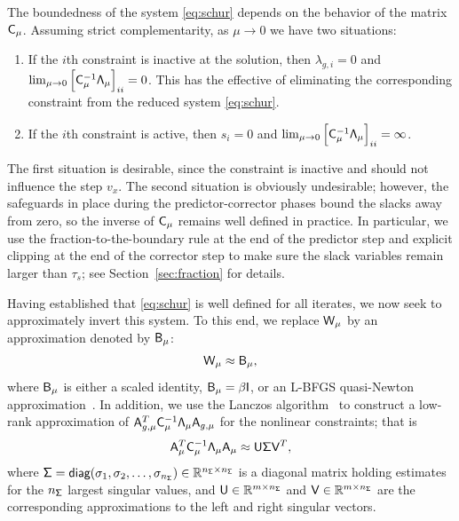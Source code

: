 The boundedness of the system \eqref{eq:schur} depends on the behavior of the
matrix $\mathsf{C}_{\mu}$.  Assuming strict complementarity, as $\mu\rightarrow 0$
we have two situations:
\begin{enumerate}
\item If the $i$th constraint is inactive at the solution, then $\lambda_{g,i} = 0$ and
  $\lim_{\mu\rightarrow 0} \left[\mathsf{C}_\mu^{-1} \mathsf{\Lambda}_\mu \right]_{ii}
  = 0$.  This has the effective of eliminating the corresponding constraint from
  the reduced system \eqref{eq:schur}.

\item If the $i$th constraint is active, then $s_i = 0$ and $\lim_{\mu\rightarrow 0}
  \left[\mathsf{C}_\mu^{-1} \mathsf{\Lambda}_\mu \right]_{ii} = \infty$.
\end{enumerate}
The first situation is desirable, since the constraint is inactive and should
not influence the step $v_x$.  The second situation is obviously undesirable;
however, the safeguards in place during the predictor-corrector phases bound the
slacks away from zero, so the inverse of $\mathsf{C}_{\mu}$ remains well defined in practice.
In particular, we use the fraction-to-the-boundary rule 
at the end of the predictor step and explicit clipping at the end of the corrector step to make sure 
the slack variables remain larger than $\tau_s$; see Section~\ref{sec:fraction} for details.



Having established that \eqref{eq:schur} is well defined for all iterates, we
now seek to approximately invert this system.  To this end, we replace
$\mathsf{W}_{\mu}$ by an approximation denoted by $\mathsf{B}_{\mu}$:
\begin{equation*}
\mathsf{W}_{\mu} \approx \mathsf{B}_{\mu},
\end{equation*}
where $\mathsf{B}_{\mu}$ is either a scaled identity, $\mathsf{B}_{\mu} = \beta
\mathsf{I}$, or an L-BFGS quasi-Newton approximation~\cite{liu:1989}.  In addition,
we use the Lanczos algorithm~\cite{saad:1992} to construct a low-rank
approximation of $\mathsf{A}_{g,\mu}^T \mathsf{C}_\mu^{-1} \mathsf{\Lambda}_\mu
\mathsf{A}_{g,\mu}$ for the nonlinear constraints; that is
\begin{equation}\label{eq:svd}
  \mathsf{A}_\mu^T  \mathsf{C}_\mu^{-1}  \mathsf{\Lambda}_{\mu}\mathsf{A}_\mu
  \approx \mathsf{U} \mathsf{\Sigma} \mathsf{V}^T,
\end{equation}
where $\mathsf{\Sigma} = \textsf{diag}(\sigma_1,\sigma_2,\ldots,\sigma_{n_{\mathsf{\Sigma}}}) \in
\mathbb{R}^{n_{\mathsf{\Sigma}}\times n_{\mathsf{\Sigma}}}$ is a diagonal matrix holding estimates for the
$n_{\mathsf{\Sigma}}$ largest singular values, and $\mathsf{U} \in \mathbb{R}^{m\times n_{\mathsf{\Sigma}}}$ and
$\mathsf{V} \in \mathbb{R}^{m\times n_{\mathsf{\Sigma}}}$ are the corresponding approximations to the
left and right singular vectors. 

